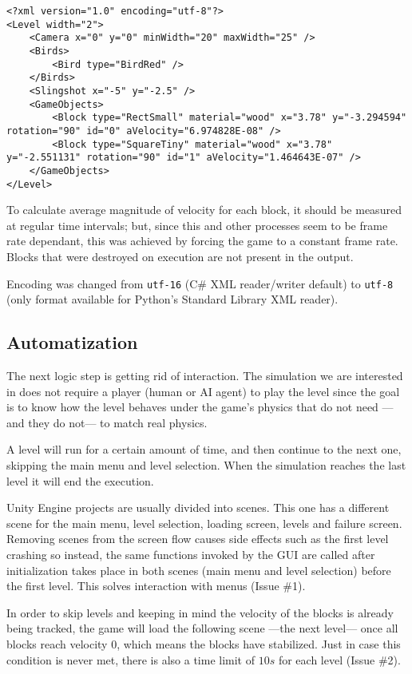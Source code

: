 \lstset{language=XML}
\begin{lstlisting}[caption=Sample level output to show format, label=xmlsampleOUT]
<?xml version="1.0" encoding="utf-8"?>
<Level width="2">
	<Camera x="0" y="0" minWidth="20" maxWidth="25" />
	<Birds>
		<Bird type="BirdRed" />
	</Birds>
	<Slingshot x="-5" y="-2.5" />
	<GameObjects>
		<Block type="RectSmall" material="wood" x="3.78" y="-3.294594" rotation="90" id="0" aVelocity="6.974828E-08" />
		<Block type="SquareTiny" material="wood" x="3.78" y="-2.551131" rotation="90" id="1" aVelocity="1.464643E-07" />
	</GameObjects>
</Level>
\end{lstlisting}

To calculate average magnitude of velocity for each block, it should be measured at regular time intervals; but, since this and other processes seem to be frame rate dependant, this was achieved by forcing the game to a constant frame rate. Blocks that were destroyed on execution are not present in the output.

Encoding was changed from \texttt{utf-16} (C\# XML reader/writer default) to \texttt{utf-8} (only format available for Python's Standard Library XML reader).

\subsection{Automatization}

The next logic step is getting rid of interaction. The simulation we are interested in does not require a player (human or AI agent) to play the level since the goal is to know how the level behaves under the game's physics that do not need ---and they do not--- to match real physics. 

A level will run for a certain amount of time, and then continue to the next one, skipping the main menu and level selection. When the simulation reaches the last level it will end the execution.

Unity Engine projects are usually divided into scenes. This one has a different scene for the main menu, level selection, loading screen, levels and failure screen. Removing scenes from the screen flow causes side effects such as the first level crashing so instead, the same functions invoked by the \acs{GUI} are called after initialization takes place in both scenes (main menu and level selection) before the first level. This solves interaction with menus (Issue \#1). 

In order to skip levels and keeping in mind the velocity of the blocks is already being tracked, the game will load the following scene ---the next level--- once all blocks reach velocity $0$, which means the blocks have stabilized. Just in case this condition is never met, there is also a time limit of $10s$ for each level (Issue \#2). 

